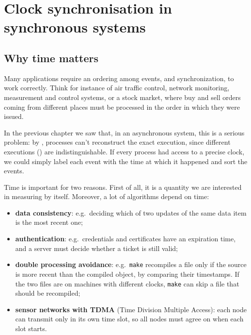 
\section{Clock synchronisation in synchronous systems}

\subsection{Why time matters}

Many applications require an ordering among events, and synchronization, to work correctly. Think for instance of air traffic control, network monitoring, measurement and control systems, or a stock market, where buy and sell orders coming from different places must be processed in the order in which they were issued.

In the previous chapter we saw that, in an asynchronous system, this is a serious problem: by , processes can't reconstruct the exact execution, since different executions () are indistinguishable. If every process had access to a precise clock, we could simply label each event with the time at which it happened and sort the events.

Time is important for two reasons. First of all, it is a quantity we are interested in measuring by itself. Moreover, a lot of algorithms depend on time:
\begin{itemize}
  \item \textbf{data consistency}: e.g.\ deciding which of two updates of the same data item is the most recent one;
  \item \textbf{authentication}: e.g.\ credentials and certificates have an expiration time, and a server must decide whether a ticket is still valid;
  \item \textbf{double processing avoidance}: e.g.\ \texttt{make} recompiles a file only if the source is more recent than the compiled object, by comparing their timestamps. If the two files are on machines with different clocks, \texttt{make} can skip a file that should be recompiled;
  \item \textbf{sensor networks with TDMA} (Time Division Multiple Access): each node can transmit only in its own time slot, so all nodes must agree on when each slot starts.
\end{itemize}

